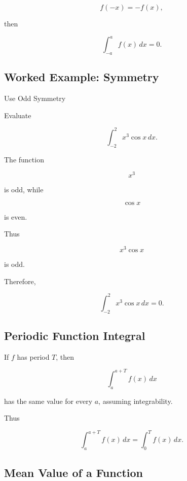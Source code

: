 \[
f(-x)=-f(x),
\]

then

\[
\boxed{
\int_{-a}^{a}
f(x)\,dx
=
0.
}
\]

\subsection{Worked Example: Symmetry}
\label{subsec:worked-integral-symmetry}

\begin{workedexamplebox}{Use Odd Symmetry}

Evaluate

\[
\int_{-2}^{2}
x^3\cos x
\,dx.
\]

The function

\[
x^3
\]

is odd, while

\[
\cos x
\]

is even.

Thus

\[
x^3\cos x
\]

is odd.

Therefore,

\begin{answerbox}
\[
\boxed{
\int_{-2}^{2}
x^3\cos x
\,dx
=
0.
}
\]
\end{answerbox}

\end{workedexamplebox}

\subsection{Periodic Function Integral}
\label{subsec:periodic-integral-reference}

If \(f\) has period \(T\), then

\[
\boxed{
\int_a^{a+T}
f(x)\,dx
}
\]

has the same value for every \(a\), assuming integrability.

Thus

\[
\boxed{
\int_a^{a+T}
f(x)\,dx
=
\int_0^T
f(x)\,dx.
}
\]

\subsection{Mean Value of a Function}
\label{subsec:average-value-integral-reference}

